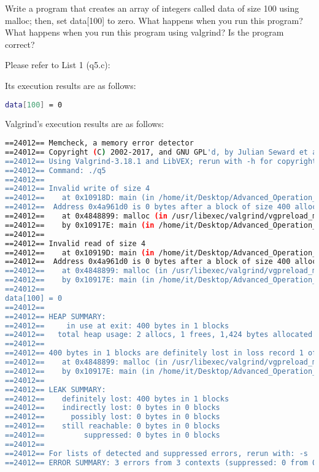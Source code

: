 \documentclass[10pt, answers]{exam}
\begin{document}
\begin{questions} 
        \setcounter{question}{4} 
        
        \question 
        Write a program that creates an array of integers called data
        of size 100 using malloc; then, set data[100] to zero. What happens
        when you run this program? What happens when you run this
        program using valgrind? Is the program correct?

        
        \begin{solution}
        Please refer to List 1 (q5.c):
        
        
        
        Its execution results are as follows:
        
        \begin{lstlisting}[language=bash]
data[100] = 0
        \end{lstlisting}
        
        Valgrind's execution results are as follows:
        
        \begin{lstlisting}[language=bash]
==24012== Memcheck, a memory error detector
==24012== Copyright (C) 2002-2017, and GNU GPL'd, by Julian Seward et al.
==24012== Using Valgrind-3.18.1 and LibVEX; rerun with -h for copyright info
==24012== Command: ./q5
==24012==
==24012== Invalid write of size 4
==24012==    at 0x10918D: main (in /home/it/Desktop/Advanced_Operation_Systen/hw3/q5)
==24012==  Address 0x4a961d0 is 0 bytes after a block of size 400 alloc'd
==24012==    at 0x4848899: malloc (in /usr/libexec/valgrind/vgpreload_memcheck-amd64-linux.so)
==24012==    by 0x10917E: main (in /home/it/Desktop/Advanced_Operation_Systen/hw3/q5)
==24012==
==24012== Invalid read of size 4
==24012==    at 0x10919D: main (in /home/it/Desktop/Advanced_Operation_Systen/hw3/q5)
==24012==  Address 0x4a961d0 is 0 bytes after a block of size 400 alloc'd
==24012==    at 0x4848899: malloc (in /usr/libexec/valgrind/vgpreload_memcheck-amd64-linux.so)
==24012==    by 0x10917E: main (in /home/it/Desktop/Advanced_Operation_Systen/hw3/q5)
==24012==
data[100] = 0
==24012==
==24012== HEAP SUMMARY:
==24012==     in use at exit: 400 bytes in 1 blocks
==24012==   total heap usage: 2 allocs, 1 frees, 1,424 bytes allocated
==24012==
==24012== 400 bytes in 1 blocks are definitely lost in loss record 1 of 1
==24012==    at 0x4848899: malloc (in /usr/libexec/valgrind/vgpreload_memcheck-amd64-linux.so)
==24012==    by 0x10917E: main (in /home/it/Desktop/Advanced_Operation_Systen/hw3/q5)
==24012==
==24012== LEAK SUMMARY:
==24012==    definitely lost: 400 bytes in 1 blocks
==24012==    indirectly lost: 0 bytes in 0 blocks
==24012==      possibly lost: 0 bytes in 0 blocks
==24012==    still reachable: 0 bytes in 0 blocks
==24012==         suppressed: 0 bytes in 0 blocks
==24012==
==24012== For lists of detected and suppressed errors, rerun with: -s
==24012== ERROR SUMMARY: 3 errors from 3 contexts (suppressed: 0 from 0)
        \end{lstlisting}
        

\end{solution}
\end{questions}
\end{document}
